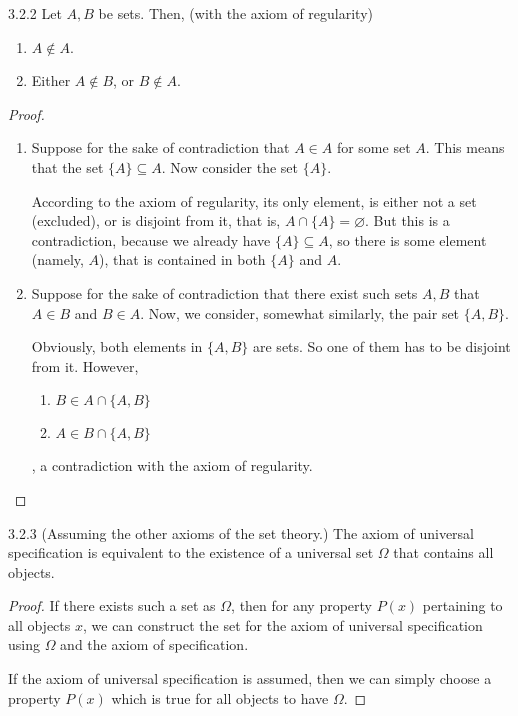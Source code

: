 \begin{exercise}{3.2.2}
	Let $A,B$ be sets. Then, (with the axiom of regularity)
	\begin{enumerate}
		\item $A \notin A$.
		\item Either $A \notin B$, or $B \notin A$.
	\end{enumerate}
\end{exercise}
\begin{proof}\leavevmode
	\begin{enumerate}
		\item Suppose for the sake of contradiction that $A \in A$ for some set $A$. This means that the set $\{A\} \subseteq A$. Now consider the set $\{A\}$.
		
		According to the axiom of regularity, its only element, is either not a set (excluded), or is disjoint from it, that is, $A \cap \{A\} = \varnothing$. But this is a contradiction, because we already have $\{A\} \subseteq A$, so there is some element (namely, $A$), that is contained in both $\{A\}$ and $A$.
		
		\item Suppose for the sake of contradiction that there exist such sets $A,B$ that $A \in B$ and $B \in A$. Now, we consider, somewhat similarly, the pair set $\{A,B\}$.
		
		Obviously, both elements in $\{A,B\}$ are sets. So one of them has to be disjoint from it. However,
		\begin{enumerate}
			\item $B \in A \cap \{A,B\}$
			\item $A \in B \cap \{A,B\}$ 	
		\end{enumerate}
		, a contradiction with the axiom of regularity.
	\end{enumerate}
\end{proof}

\begin{exercise}{3.2.3}
	(Assuming the other axioms of the set theory.) The axiom of universal specification is equivalent to the existence of a universal set $\Omega$ that contains all objects.
\end{exercise}
\begin{proof}
	 If there exists such a set as $\Omega$, then for any property $P(x)$ pertaining to all objects $x$, we can construct the set for the axiom of universal specification using $\Omega$ and the axiom of specification.
	
	 If the axiom of universal specification is assumed, then we can simply choose a property $P(x)$ which is true for all objects to have $\Omega$.
\end{proof}

